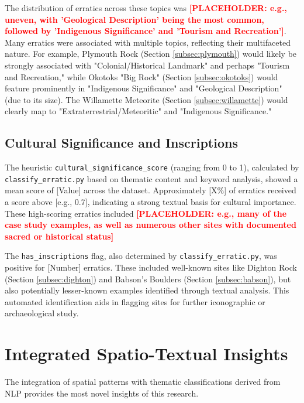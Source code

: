 \documentclass[
11pt, %
english, %
singlespacing, %
headsepline, %
]{MastersDoctoralThesis} %
\newcommand{\placeholdertext}[1]{\textcolor{red}{\textbf{[PLACEHOLDER: #1]}}}
\begin{document}
The distribution of erratics across these topics was \placeholdertext{e.g., uneven, with 'Geological Description' being the most common, followed by 'Indigenous Significance' and 'Tourism and Recreation'}. Many erratics were associated with multiple topics, reflecting their multifaceted nature. For example, Plymouth Rock (Section \ref{subsec:plymouth}) would likely be strongly associated with "Colonial/Historical Landmark" and perhaps "Tourism and Recreation," while Okotoks "Big Rock" (Section \ref{subsec:okotoks}) would feature prominently in "Indigenous Significance" and "Geological Description" (due to its size). The Willamette Meteorite (Section \ref{subsec:willamette}) would clearly map to "Extraterrestrial/Meteoritic" and "Indigenous Significance."

\subsection{Cultural Significance and Inscriptions}
\label{subsec:cultural_significance_inscriptions_results}
The heuristic \texttt{cultural\_significance\_score} (ranging from 0 to 1), calculated by \texttt{classify\_erratic.py} based on thematic content and keyword analysis, showed a mean score of [Value] across the dataset. Approximately [X\%] of erratics received a score above [e.g., 0.7], indicating a strong textual basis for cultural importance. These high-scoring erratics included \placeholdertext{e.g., many of the case study examples, as well as numerous other sites with documented sacred or historical status}

The \texttt{has\_inscriptions} flag, also determined by \texttt{classify\_erratic.py}, was positive for [Number] erratics. These included well-known sites like Dighton Rock (Section \ref{subsec:dighton}) and Babson's Boulders (Section \ref{subsec:babson}), but also potentially lesser-known examples identified through textual analysis. This automated identification aids in flagging sites for further iconographic or archaeological study.

\section{Integrated Spatio-Textual Insights}
\label{sec:integrated_spatio_textual_insights}

The integration of spatial patterns with thematic classifications derived from NLP provides the most novel insights of this research.
\end{document}
